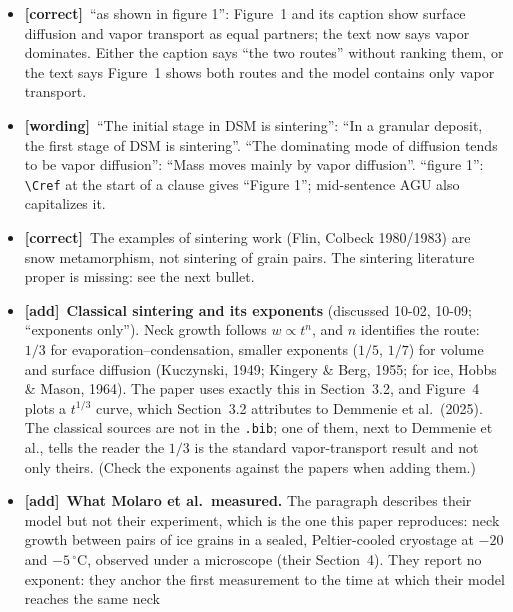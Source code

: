 \documentclass[11pt]{article}
\newcommand{\tC}{\textcolor{miss}{\textbf{[correct]}}\ }
\newcommand{\tG}{\textcolor{stale}{\textbf{[wording]}}\ }
\newcommand{\tA}{\textcolor{have}{\textbf{[add]}}\ }
\begin{document}
\begin{enumerate}
\begin{itemize}
    (Molaro et al., 2019; Choukroun et al., 2020)'': Choukroun et al.\
    interpret their activation energy as close to that of surface
    self-diffusion, so they are not a source for vapor dominance. Cite
    Molaro et al.\ alone, and say ``for necks larger than a few
    micrometres'' (their own rates; Appendix~A of this outline).
  \item \tC ``as shown in figure 1'': Figure~1 and its caption show surface
    diffusion and vapor transport as equal partners; the text now says vapor
    dominates. Either the caption says ``the two routes'' without ranking
    them, or the text says Figure~1 shows both routes and the model
    contains only vapor transport.
  \item \tG ``The initial stage in DSM is sintering'': ``In a granular
    deposit, the first stage of DSM is sintering''. ``The dominating mode of
    diffusion tends to be vapor diffusion'': ``Mass moves mainly by vapor
    diffusion''. ``figure 1'': \verb|\Cref| at the start of a clause
    gives ``Figure 1''; mid-sentence AGU also capitalizes it.
  \item \tC The examples of sintering work (Flin, Colbeck 1980/1983) are
    snow metamorphism, not sintering of grain pairs. The sintering
    literature proper is missing: see the next bullet.
  \item \tA \textbf{Classical sintering and its exponents} (discussed 10-02,
    10-09; ``exponents only''). Neck growth follows $w \propto t^{n}$, and
    $n$ identifies the route: $1/3$ for evaporation--condensation, smaller
    exponents ($1/5$, $1/7$) for volume and surface diffusion (Kuczynski, 1949; Kingery \&
    Berg, 1955; for ice, Hobbs \& Mason, 1964). The paper uses exactly this
    in Section~3.2, and Figure~4 plots a $t^{1/3}$ curve, which Section~3.2
    attributes to Demmenie et al.\ (2025). The classical sources are not in
    the \texttt{.bib}; one of them, next to Demmenie et al., tells the reader
    the $1/3$ is the standard vapor-transport result and not only theirs.
    (Check the exponents against the papers when adding them.)
  \item \tA \textbf{What Molaro et al.\ measured.} The paragraph describes
    their model but not their experiment, which is the one this paper
    reproduces: neck growth between pairs of ice grains in a sealed,
    Peltier-cooled cryostage at $-20$ and $-5\,^{\circ}$C, observed under a
    microscope (their Section~4). They report no exponent: they anchor the
    first measurement to the time at which their model reaches the same neck

\end{itemize}
\end{enumerate}
\end{document}
